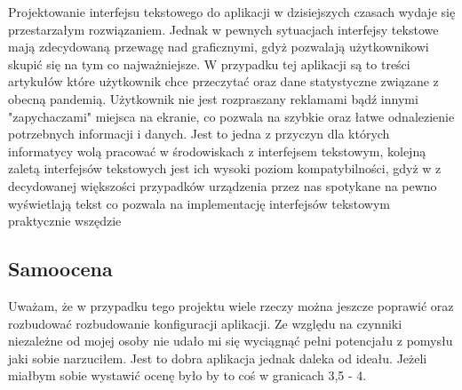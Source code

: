 \documentclass{article}
\begin{document}
Projektowanie interfejsu tekstowego do aplikacji w dzisiejszych czasach wydaje się przestarzałym rozwiązaniem. Jednak w pewnych sytuacjach
interfejsy tekstowe mają zdecydowaną przewagę nad graficznymi, gdyż pozwalają użytkownikowi skupić się na tym co najważniejsze. W przypadku tej aplikacji
są to treści artykułów które użytkownik chce przeczytać oraz dane statystyczne związane z obecną pandemią. Użytkownik nie jest rozpraszany 
reklamami bądź innymi "zapychaczami" miejsca na ekranie, co pozwala na szybkie oraz łatwe odnalezienie potrzebnych informacji i danych. Jest to
jedna z przyczyn dla których informatycy wolą pracować w środowiskach z interfejsem tekstowym, kolejną zaletą interfejsów tekstowych jest ich wysoki poziom
kompatybilności, gdyż w z decydowanej większości przypadków urządzenia przez nas spotykane na pewno wyświetlają tekst co pozwala na implementację
interfejsów tekstowym praktycznie wszędzie

\subsection{Samoocena}
Uważam, że w przypadku tego projektu wiele rzeczy można jeszcze poprawić oraz rozbudować rozbudowanie konfiguracji aplikacji. Ze względu na czynniki niezależne od mojej osoby
nie udało mi się wyciągnąć pełni potencjału z pomysłu jaki sobie narzuciłem. Jest to dobra aplikacja jednak daleka od ideału. Jeżeli miałbym sobie wystawić ocenę
było by to coś w granicach 3,5 - 4.
\end{document}
